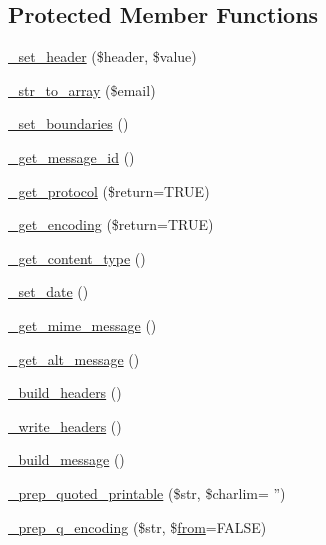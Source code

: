 \subsection*{Protected Member Functions}
\begin{DoxyCompactItemize}
\item 
\hyperlink{class_c_i___email_a9c312a256de404dc4a1fb6a8fe404480}{\-\_\-set\-\_\-header} (\$header, \$value)
\item 
\hyperlink{class_c_i___email_a64cd83e470ede0781d028d7198474d1c}{\-\_\-str\-\_\-to\-\_\-array} (\$email)
\item 
\hyperlink{class_c_i___email_a833159a24d7ecf81ad6622152bae1b52}{\-\_\-set\-\_\-boundaries} ()
\item 
\hyperlink{class_c_i___email_a253c34263736465755f85ec4192aa6b4}{\-\_\-get\-\_\-message\-\_\-id} ()
\item 
\hyperlink{class_c_i___email_a646c3efc3a23d9cc5e86ffeaf6983a51}{\-\_\-get\-\_\-protocol} (\$return=T\-R\-U\-E)
\item 
\hyperlink{class_c_i___email_aeade488121ff70d54f47173ea85e17f8}{\-\_\-get\-\_\-encoding} (\$return=T\-R\-U\-E)
\item 
\hyperlink{class_c_i___email_a0df0801e489187b9f8108ec776f98f2e}{\-\_\-get\-\_\-content\-\_\-type} ()
\item 
\hyperlink{class_c_i___email_a0c25effa0066e09273d092572709f6eb}{\-\_\-set\-\_\-date} ()
\item 
\hyperlink{class_c_i___email_a2211ba669bd8d076041d4e72bc8a9c59}{\-\_\-get\-\_\-mime\-\_\-message} ()
\item 
\hyperlink{class_c_i___email_a1a87461e94ab7466b7b6f22682c4a055}{\-\_\-get\-\_\-alt\-\_\-message} ()
\item 
\hyperlink{class_c_i___email_a5dbec091c7efce89395a40e460b75d49}{\-\_\-build\-\_\-headers} ()
\item 
\hyperlink{class_c_i___email_a6bde7269215bc1093811ae098bb034bf}{\-\_\-write\-\_\-headers} ()
\item 
\hyperlink{class_c_i___email_a9ddc60e529eb909ff0879781a6f296ff}{\-\_\-build\-\_\-message} ()
\item 
\hyperlink{class_c_i___email_aec88c27e27909418e37dd62774933cd4}{\-\_\-prep\-\_\-quoted\-\_\-printable} (\$str, \$charlim= '')
\item 
\hyperlink{class_c_i___email_a5c8549116c582a6a9e8736ba1752560c}{\-\_\-prep\-\_\-q\-\_\-encoding} (\$str, \$\hyperlink{class_c_i___email_af5636782915800ed1e28f907520b2af8}{from}=F\-A\-L\-S\-E)
\item 

\end{DoxyCompactItemize}
